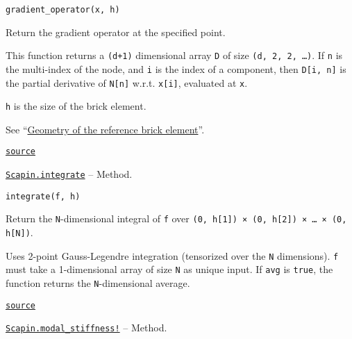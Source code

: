 \documentclass[oneside]{memoir}
\begin{document}
\begin{adjustwidth}{2em}{0pt}


\begin{verbatim}
gradient_operator(x, h)
\end{verbatim}

Return the gradient operator at the specified point.

This function returns a \texttt{(d+1)} dimensional array \texttt{D} of size \texttt{(d, 2, 2, …)}. If \texttt{n} is the multi-index of the node, and \texttt{i} is the index of a component, then \texttt{D[i, n]} is the partial derivative of \texttt{N[n]} w.r.t. \texttt{x[i]}, evaluated at \texttt{x}.

\texttt{h} is the size of the brick element.

See “\hyperlink{15016019730971184536}{Geometry of the reference brick element}”.



\href{https://github.com/sbrisard/Scapin.jl/blob/ea3f90c60e90cdf214e41b1314a8ee608e0b8d10/src/bri17.jl#L166-L178}{\texttt{source}}


\end{adjustwidth}
\hypertarget{919789657356107432}{} 
\hyperlink{919789657356107432}{\texttt{Scapin.integrate}}  -- {Method.}

\begin{adjustwidth}{2em}{0pt}


\begin{verbatim}
integrate(f, h)
\end{verbatim}

Return the \texttt{N}-dimensional integral of \texttt{f} over \texttt{(0, h[1]) × (0, h[2]) × … × (0, h[N])}.

Uses 2-point Gauss-Legendre integration (tensorized over the \texttt{N} dimensions). \texttt{f} must take a 1-dimensional array of size \texttt{N} as unique input. If \texttt{avg} is \texttt{true}, the function returns the \texttt{N}-dimensional average.



\href{https://github.com/sbrisard/Scapin.jl/blob/ea3f90c60e90cdf214e41b1314a8ee608e0b8d10/src/bri17.jl#L128-L136}{\texttt{source}}


\end{adjustwidth}
\hypertarget{6415299341137554776}{} 
\hyperlink{6415299341137554776}{\texttt{Scapin.modal\_stiffness!}}  -- {Method.}
\end{document}
